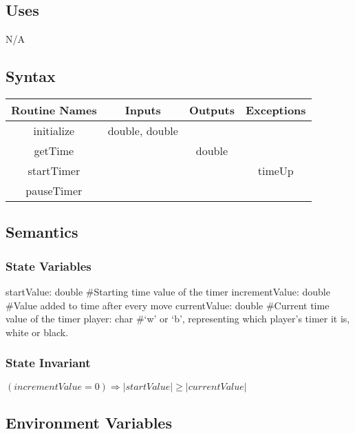 \documentclass{article}
\begin{document}
    \subsection*{Uses}
        N/A
        
    \subsection*{Syntax}
        \begin{center}
            \begin{tabular}{|c|c|c|c|} 
                \hline
                Routine Names & Inputs & Outputs & Exceptions \\
                \hline
                initialize & double, double & & \\
                \hline
                getTime & & double & \\
                \hline
                startTimer & & & timeUp \\
                \hline
                pauseTimer & & & \\
                \hline
            \end{tabular}
        \end{center}
    
    \subsection*{Semantics}
        \subsubsection*{State Variables}
            startValue: double \#Starting time value of the timer
            incrementValue: double \#Value added to time after every move
            currentValue: double \#Current time value of the timer
            player: char \#`w' or `b', representing which player's timer it is, white or black. \\
            
        \subsubsection*{State Invariant}
            $(incrementValue = 0) \Rightarrow |startValue| \geq |currentValue|$\\
            
    \subsection*{Environment Variables}
\end{document}

